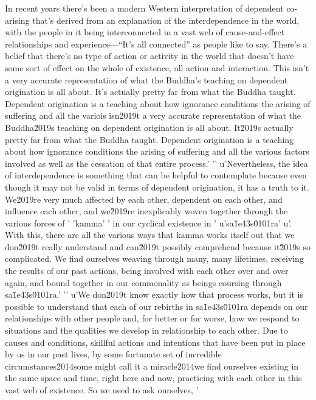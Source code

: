 In recent years there's been a modern Western interpretation of 
dependent co-arising that's derived from an explanation of the 
interdependence in the world, with the people in it being 
interconnected in a vast web of cause-and-effect relationships and 
experience---``It's all connected'' as people like to say. There's a 
belief that there's no type of action or activity in the world that 
doesn't have some sort of effect on the whole of existence, all action 
and interaction. This isn't a very accurate representation of what the 
Buddha's teaching on dependent origination is all about. It's actually 
pretty far from what the Buddha taught. Dependent origination is a 
teaching about how ignorance conditions the arising of suffering and 
all the variois isn\u2019t a very accurate representation of what the Buddha\u2019s teaching on dependent origination is all about. It\u2019s actually pretty far from what the Buddha taught. Dependent origination is a teaching about how ignorance conditions the arising of suffering and all the various factors involved as well as the cessation of that entire process.'
'\n'
u'Nevertheless, the idea of interdependence is something that can be helpful to contemplate because even though it may not be valid in terms of dependent origination, it has a truth to it. We\u2019re very much affected by each other, dependent on each other, and influence each other, and we\u2019re inexplicably woven together through the various forces of '
'kamma'
' in our cyclical existence in '
u'sa\u1e43s\u0101ra'
u'. With this, there are all the various ways that kamma works itself out that we don\u2019t really understand and can\u2019t possibly comprehend because it\u2019s so complicated. We find ourselves weaving through many, many lifetimes, receiving the results of our past actions, being involved with each other over and over again, and bound together in our commonality as beings coursing through sa\u1e43s\u0101ra.'
'\n'
u'We don\u2019t know exactly how that process works, but it is possible to understand that each of our rebirths in sa\u1e43s\u0101ra depends on our relationships with other people and, for better or for worse, how we respond to situations and the qualities we develop in relationship to each other. Due to causes and conditions, skillful actions and intentions that have been put in place by us in our past lives, by some fortunate set of incredible circumstances\u2014some might call it a miracle\u2014we find ourselves existing in the same space and time, right here and now, practicing with each other in this vast web of existence. So we need to ask ourselves, '
